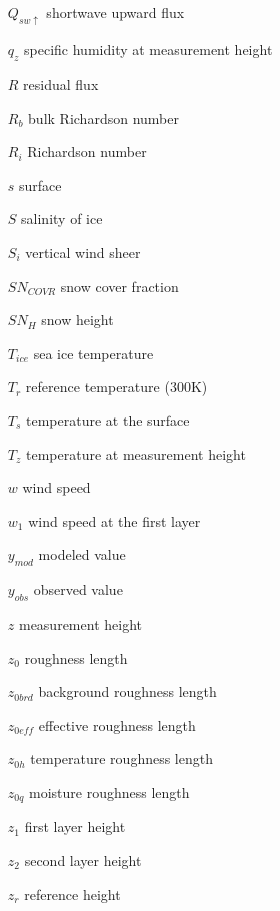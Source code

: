\begin{enumerate}
    \item[$Q_{sw \uparrow}$] shortwave upward flux
    \item[$q_{z}$] specific humidity at measurement height
    \item[$R$] residual flux
    \item[$R_{b}$] bulk Richardson number
    \item[$R_{i}$] Richardson number
    \item[$s$] surface
    \item[$S$] salinity of ice
    \item[$S_{i}$] vertical wind sheer
    \item[$SN_{COVR}$] snow cover fraction
    \item[$SN_{H}$] snow height
    \item[$T_{ice}$] sea ice temperature
    \item[$T_{r}$] reference temperature (300K)
    \item[$T_{s}$] temperature at the surface
    \item[$T_{z}$] temperature at measurement height
    \item[$w$] wind speed
    \item[$w_{1}$] wind speed at the first layer
    \item[$y_{mod}$] modeled value
    \item[$y_{obs}$] observed value
    \item[$z$] measurement height
    \item[$z_{0}$] roughness length
    \item[$z_{0brd}$] background roughness length
    \item[$z_{0eff}$] effective roughness length
    \item[$z_{0h}$] temperature roughness length
    \item[$z_{0q}$] moisture roughness length
    \item[$z_{1}$] first layer height
    \item[$z_{2}$] second layer height
    \item[$z_{r}$] reference height
\end{enumerate}
